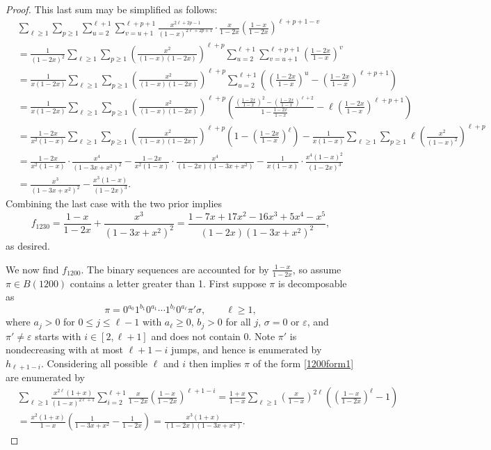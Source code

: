 \documentclass{article}
\theoremstyle{remark}
\theoremstyle{plain}
\begin{document}
\begin{proof}
This last sum may be simplified as follows:
\begin{align*}
&\sum_{\ell \geq1}\sum_{p \geq1}\sum_{u=2}^{\ell+1}\sum_{v=u+1}^{\ell+p+1}\frac{x^{2\ell+2p-1}}{(1-x)^{2\ell+2p+1}}\cdot\frac{x}{1-2x}\left(\frac{1-x}{1-2x}\right)^{\ell+p+1-v}\\
&=\frac{1}{(1-2x)^2}\sum_{\ell \geq1}\sum_{p \geq1}\left(\frac{x^2}{(1-x)(1-2x)}\right)^{\ell+p}\sum_{u=2}^{\ell+1}\sum_{v=u+1}^{\ell+p+1}\left(\frac{1-2x}{1-x}\right)^v\\
&=\frac{1}{x(1-2x)}\sum_{\ell \geq1}\sum_{p \geq1}\left(\frac{x^2}{(1-x)(1-2x)}\right)^{\ell+p}\sum_{u=2}^{\ell+1}\left(\left(\frac{1-2x}{1-x}\right)^u-\left(\frac{1-2x}{1-x}\right)^{\ell+p+1}\right)\qquad\qquad\qquad\qquad\quad\\
&=\frac{1}{x(1-2x)}\sum_{\ell \geq1}\sum_{p \geq1}\left(\frac{x^2}{(1-x)(1-2x)}\right)^{\ell+p}\left(\frac{\left(\frac{1-2x}{1-x}\right)^2-\left(\frac{1-2x}{1-x}\right)^{\ell+2}}{1-\frac{1-2x}{1-x}}-\ell\left(\frac{1-2x}{1-x}\right)^{\ell+p+1}\right)\\
&=\frac{1-2x}{x^2(1-x)}\sum_{\ell \geq1}\sum_{p \geq1}\left(\frac{x^2}{(1-x)(1-2x)}\right)^{\ell+p}\left(1-\left(\frac{1-2x}{1-x}\right)^\ell\right)-\frac{1}{x(1-x)}\sum_{\ell\geq1}\sum_{p\geq1}\ell\left(\frac{x^2}{(1-x)^2}\right)^{\ell+p}\\
&=\frac{1-2x}{x^2(1-x)}\cdot\frac{x^4}{(1-3x+x^2)^2}-\frac{1-2x}{x^2(1-x)}\cdot\frac{x^4}{(1-2x)(1-3x+x^2)}-\frac{1}{x(1-x)}\cdot\frac{x^4(1-x)^2}{(1-2x)^3}\\
&=\frac{x^3}{(1-3x+x^2)^2}-\frac{x^3(1-x)}{(1-2x)^3}.
\end{align*}
Combining the last case with the two prior implies
$$f_{1230}=\frac{1-x}{1-2x}+\frac{x^3}{(1-3x+x^2)^2}=\frac{1-7x+17x^2-16x^3+5x^4-x^5}{(1-2x)(1-3x+x^2)^2},$$
as desired.

We now find $f_{1200}$. The binary sequences are accounted for by $\frac{1-x}{1-2x}$, so assume $\pi \in B(1200)$ contains a letter greater than 1.  First suppose $\pi$ is decomposable as
\begin{equation}\label{1200form1}
\pi=0^{a_0}1^{b_1}0^{a_1}\cdots1^{b_\ell}0^{a_\ell}\pi'\sigma, \qquad \ell \geq 1,
\end{equation}
where $a_j>0$ for $0 \leq j \leq \ell-1$ with $a_\ell \geq0$, $b_j>0$ for all $j$, $\sigma=0$ or $\varepsilon$, and $\pi' \neq \varepsilon$ starts with $i \in [2,\ell+1]$ and does not contain 0. Note $\pi'$ is nondecreasing with at most $\ell+1-i$ jumps, and hence is enumerated by $h_{\ell+1-i}$. Considering all possible $\ell$ and $i$ then implies $\pi$ of the form \eqref{1200form1} are enumerated by
\begin{align*}
&\sum_{\ell \geq1}\frac{x^{2\ell}(1+x)}{(1-x)^{2\ell+1}}\sum_{i=2}^{\ell+1}\frac{x}{1-2x}\left(\frac{1-x}{1-2x}\right)^{\ell+1-i}=\frac{1+x}{1-x}\sum_{\ell \geq1}\left(\frac{x}{1-x}\right)^{2\ell}\left(\left(\frac{1-x}{1-2x}\right)^\ell-1\right)\\
&=\frac{x^2(1+x)}{1-x}\left(\frac{1}{1-3x+x^2}-\frac{1}{1-2x}\right)=\frac{x^3(1+x)}{(1-2x)(1-3x+x^2)}.
\end{align*}


\end{proof}
\end{document}
